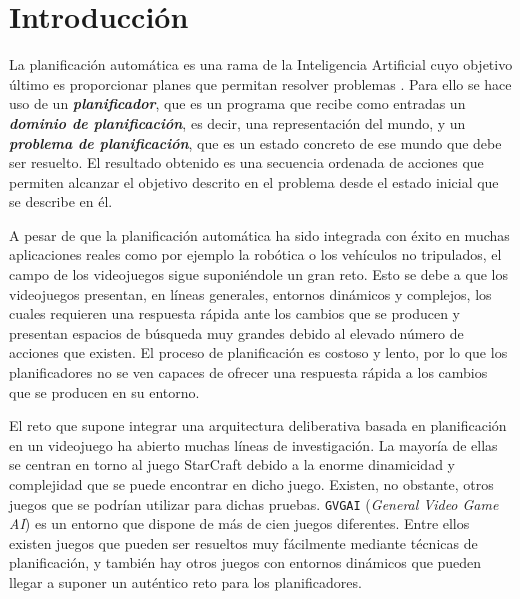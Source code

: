
\chapter{Introducción}

La planificación automática es una rama de la Inteligencia Artificial cuyo objetivo
último es proporcionar planes que permitan resolver problemas \cite{10.5555/3073924}.
Para ello se hace uso de un \textbf{\textit{planificador}}, que es un programa que recibe
como entradas un \textbf{\textit{dominio de planificación}}, es decir, una representación
del mundo, y un \textbf{\textit{problema de planificación}}, que es un estado concreto de
ese mundo que debe ser resuelto. El resultado obtenido es una secuencia ordenada de acciones
que permiten alcanzar el objetivo descrito en el problema desde el estado
inicial que se describe en él.

A pesar de que la planificación automática ha sido integrada con éxito en muchas aplicaciones
reales como por ejemplo la robótica o los vehículos no tripulados, el campo de los videojuegos
sigue suponiéndole un gran reto. Esto se debe a que los videojuegos presentan, en líneas generales,
entornos dinámicos y complejos, los cuales requieren una respuesta rápida ante los cambios que se producen
y presentan espacios de búsqueda muy grandes debido al elevado número de acciones que existen.
El proceso de planificación es costoso y lento, por lo que los planificadores no se ven
capaces de ofrecer una respuesta rápida a los cambios que se producen en su entorno.

El reto que supone integrar una arquitectura deliberativa basada en planificación en un videojuego ha
abierto muchas líneas de investigación. La mayoría de ellas se centran en torno al juego
StarCraft \cite{10.1007/978-3-540-74141-1_12, Churchill2011BuildOO, Weber2011BuildingHA, Aha_2018}
debido a la enorme dinamicidad y complejidad que se puede encontrar en dicho juego.
Existen, no obstante, otros juegos que se podrían utilizar para dichas pruebas.
\texttt{GVGAI} (\textit{General Video Game AI})\cite{7038214} es un entorno que
dispone de más de cien juegos diferentes. Entre ellos existen juegos que pueden ser resueltos
muy fácilmente mediante técnicas de planificación, y también hay otros juegos con entornos
dinámicos que pueden llegar a suponer un auténtico reto para los planificadores.

